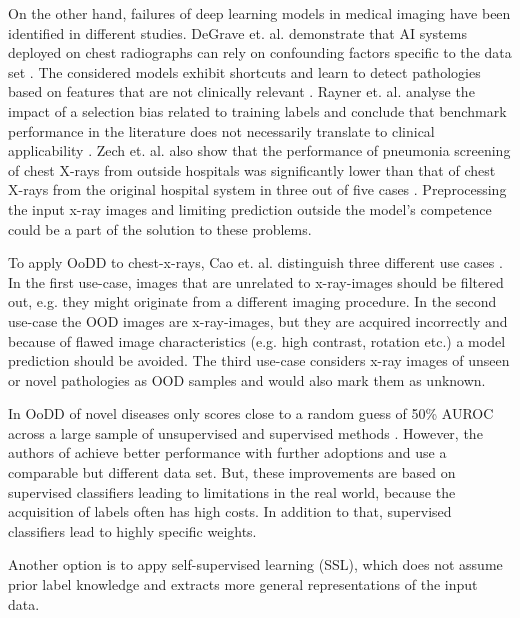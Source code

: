 On the other hand, failures of deep learning models in medical imaging have been identified in different studies.
DeGrave et. al. demonstrate that AI systems deployed on chest radiographs can rely on confounding factors specific to the data set \citep{Degrave2021}.
The considered models exhibit shortcuts and learn to detect pathologies based on features that are not clinically relevant \citep{Degrave2021}.
Rayner et. al. analyse the impact of a selection bias related to training labels and conclude that benchmark performance in the literature does not necessarily translate to clinical applicability \citep{Rayner2019}.
Zech et. al. also show that the performance of pneumonia screening of chest X-rays from outside hospitals was significantly lower than that of chest X-rays from the original hospital system in three out of five cases \citep{Zech2018}.
Preprocessing the input x-ray images and limiting prediction outside the model's competence could be a part of the solution to these problems.
\par
To apply OoDD to chest-x-rays, Cao et. al. distinguish three different use cases \citep{Cao2020}.
In the first use-case, images that are unrelated to x-ray-images should be filtered out, e.g. they might originate from a different imaging procedure.
In the second use-case the OOD images are x-ray-images, but they are acquired incorrectly and because of flawed image characteristics (e.g. high contrast, rotation etc.) a model prediction should be avoided.
The third use-case considers x-ray images of unseen or novel pathologies as OOD samples and would also mark them as unknown.
\par
In \citep{Cao2020} OoDD of novel diseases only scores close to a random guess of 50\% AUROC across a large sample of unsupervised and supervised methods \citep{Cao2020}.
However, the authors of \citep{Berger2021} achieve better performance with further adoptions and use a comparable but different data set.
But, these improvements are based on supervised classifiers leading to limitations in the real world, because the acquisition of labels often has high costs. 
In addition to that, supervised classifiers lead to highly specific weights.
\par
Another option is to appy self-supervised learning (SSL), which does not assume prior label knowledge and extracts more general representations of the input data.
